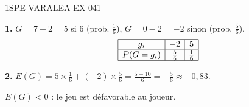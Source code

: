 \begin{corrige}{1SPE-VARALEA-EX-041}

\textbf{1.} $G = 7-2 = 5$ si $6$ (prob. $\frac{1}{6}$), $G = 0-2 = -2$ sinon (prob. $\frac{5}{6}$).
\[
\begin{array}{|c|c|c|}
\hline
g_i & -2 & 5 \\
\hline
P(G=g_i) & \frac{5}{6} & \frac{1}{6} \\
\hline
\end{array}
\]

\medskip
\textbf{2.} $E(G) = 5 \times \frac{1}{6} + (-2) \times \frac{5}{6} = \frac{5-10}{6} = -\frac{5}{6} \approx -0{,}83$.

$E(G) < 0$ : le jeu est défavorable au joueur.

\end{corrige}
